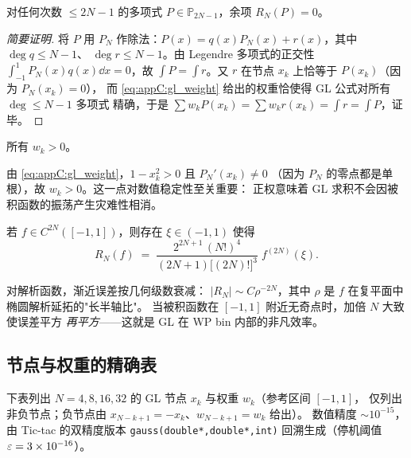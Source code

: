 \begin{theorem}[$2N-1$ 阶代数精度]\label{thm:appC:exactness}
对任何次数 $\le 2N-1$ 的多项式 $P\in\mathbb{P}_{2N-1}$，余项 $R_N(P)=0$。
\end{theorem}

\begin{proof}[简要证明]
将 $P$ 用 $P_N$ 作除法：$P(x)=q(x)P_N(x)+r(x)$，其中 $\deg q\le N-1$、
$\deg r\le N-1$。由 Legendre 多项式的正交性 $\int_{-1}^{1}P_N(x)q(x)\dd x=0$，故
$\int P=\int r$。又 $r$ 在节点 $x_k$ 上恰等于 $P(x_k)$（因为 $P_N(x_k)=0$），
而 \eqref{eq:appC:gl_weight} 给出的权重恰使得 GL 公式对所有 $\deg\le N-1$ 多项式
精确，于是 $\sum w_k P(x_k)=\sum w_k r(x_k)=\int r=\int P$，证毕。
\end{proof}

\begin{theorem}[正权]\label{thm:appC:positive_weights}
所有 $w_k>0$。
\end{theorem}

由 \eqref{eq:appC:gl_weight}，$1-x_k^{2}>0$ 且 $P_N'(x_k)\neq 0$
（因为 $P_N$ 的零点都是单根），故 $w_k>0$。这一点对数值稳定性至关重要：
正权意味着 GL 求积不会因被积函数的振荡产生灾难性相消。

\begin{theorem}[误差表达]\label{thm:appC:error}
若 $f\in C^{2N}([-1,1])$，则存在 $\xi\in(-1,1)$ 使得
\begin{equation}
  R_N(f) \;=\; \frac{2^{2N+1}\,(N!)^{4}}{(2N+1)\bigl[(2N)!\bigr]^{3}}\;f^{(2N)}(\xi).
  \label{eq:appC:gl_error}
\end{equation}
\end{theorem}

\begin{remark}
对解析函数，渐近误差按几何级数衰减：
$|R_N|\sim C\rho^{-2N}$，其中 $\rho$ 是 $f$ 在复平面中椭圆解析延拓的"长半轴比"。
当被积函数在 $[-1,1]$ 附近无奇点时，加倍 $N$ 大致使误差平方
\emph{再平方}——这就是 GL 在 WP bin 内部的非凡效率。
\end{remark}

\subsection{节点与权重的精确表}
\label{sec:appC:nodes_weights}

下表列出 $N=4,8,16,32$ 的 GL 节点 $x_k$ 与权重 $w_k$（参考区间 $[-1,1]$，
仅列出非负节点；负节点由 $x_{N-k+1}=-x_k$、$w_{N-k+1}=w_k$ 给出）。
数值精度 $\sim 10^{-15}$，由 Tic-tac 的双精度版本 \texttt{gauss(double*,double*,int)}
回溯生成（停机阈值 $\varepsilon=3\times 10^{-16}$）。

